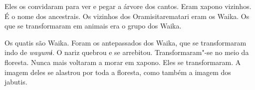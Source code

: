 Eles os convidaram para ver e pegar a árvore dos cantos. Eram xapono
vizinhos. É o nome dos ancestrais. Os vizinhos dos Oramisitarematari
eram os Waika. Os que se transformaram em animais era o grupo dos
Waika. 

Os quatis são Waika. Foram os antepassados dos Waika, que se
transformaram indo de \emph{wayumɨ}. O nariz quebrou e se arrebitou.
Transformaram"-se no meio da floresta. Nunca mais voltaram a morar em
xapono. Eles se transformaram. A imagem deles se alastrou por toda a
floresta, como também a imagem dos jabutis.

 

 

 
